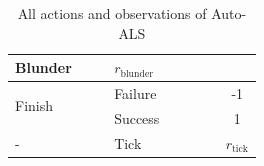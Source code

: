 \begin{table}[H]
\begin{tabular}{|p{0.4\linewidth}|p{0.45\linewidth}|c|}
   Blunder & $r_\text{blunder}$
   \\
   \midrule
   \multirow{2}{*}{Finish} & Failure & -1 \\
   & Success & 1 \\
   \midrule
   - & Tick & $r_\text{tick}$ \\
  \bottomrule
\end{tabular}
\caption{All actions and observations of Auto-ALS}
\label{tab:auto-als}
\end{table}
